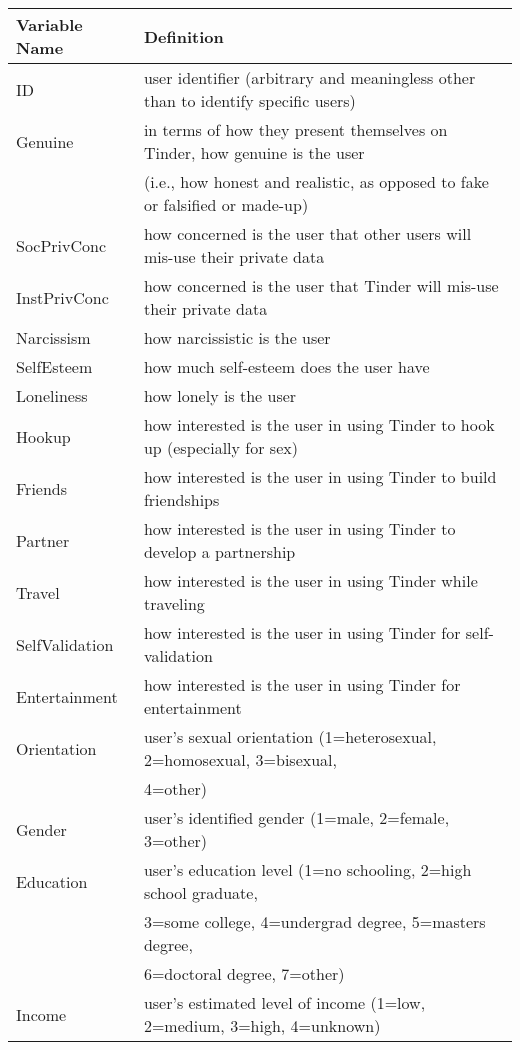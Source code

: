 \documentclass[12pt]{report}
\begin{document}
\begin{center}
\begin{tabular}{l l}
Variable Name & Definition\\ \hline
ID & user identifier (arbitrary and meaningless other than to identify specific users)\\ \hline
Genuine & in terms of how they present themselves on Tinder, how genuine is the user\\
  & (i.e., how honest and realistic, as opposed to fake or falsified or made-up)\\ \hline
SocPrivConc & how concerned is the user that other users will mis-use their private data\\ \hline
InstPrivConc & how concerned is the user that Tinder will mis-use their private data\\ \hline
Narcissism & how narcissistic is the user\\  \hline
SelfEsteem & how much self-esteem does the user have\\ \hline
Loneliness & how lonely is the user\\ \hline
Hookup & how interested is the user in using Tinder to hook up (especially for sex)\\ \hline
Friends & how interested is the user in using Tinder to build friendships\\ \hline
Partner & how interested is the user in using Tinder to develop a partnership\\ \hline
Travel & how interested is the user in using Tinder while traveling\\ \hline
SelfValidation & how interested is the user in using Tinder for self-validation\\ \hline
Entertainment & how interested is the user in using Tinder for entertainment\\ \hline
Orientation & user's sexual orientation (1=heterosexual, 2=homosexual, 3=bisexual,\\
&  4=other)\\  \hline
Gender & user's identified gender (1=male, 2=female, 3=other)\\ \hline
Education & user's education level (1=no schooling, 2=high school graduate,\\
          & 3=some college, 4=undergrad degree, 5=masters degree,\\
          &  6=doctoral degree, 7=other)\\ \hline
Income & user's estimated level of income (1=low, 2=medium, 3=high, 4=unknown)\\ \hline

\end{tabular}
\end{center}
\end{document}
